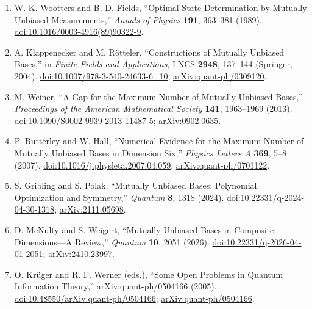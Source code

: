 \begin{enumerate}[label={},leftmargin=4.8em,labelsep=0.5em]
  \footnotesize
  \item[\textup{[WF89]}]\label{ref:p44-wootters-fields}
  W. K. Wootters and B. D. Fields,
  ``Optimal State-Determination by Mutually Unbiased Measurements,''
  \emph{Annals of Physics} \textbf{191}, 363--381 (1989).
  \href{https://doi.org/10.1016/0003-4916(89)90322-9}%
       {doi:10.1016/0003-4916(89)90322-9}.

  \item[\textup{[KR04]}]\label{ref:p44-klappenecker-roetteler}
  A. Klappenecker and M. R\"otteler,
  ``Constructions of Mutually Unbiased Bases,'' in
  \emph{Finite Fields and Applications}, LNCS \textbf{2948}, 137--144
  (Springer, 2004).
  \href{https://doi.org/10.1007/978-3-540-24633-6_10}%
       {doi:10.1007/978-3-540-24633-6\_10};
  \href{https://arxiv.org/abs/quant-ph/0309120}{arXiv:quant-ph/0309120}.

  \item[\textup{[Wei13]}]\label{ref:p44-weiner}
  M. Weiner, ``A Gap for the Maximum Number of Mutually Unbiased Bases,''
  \emph{Proceedings of the American Mathematical Society} \textbf{141},
  1963--1969 (2013).
  \href{https://doi.org/10.1090/S0002-9939-2013-11487-5}%
       {doi:10.1090/S0002-9939-2013-11487-5};
  \href{https://arxiv.org/abs/0902.0635}{arXiv:0902.0635}.

  \item[\textup{[BH07]}]\label{ref:p44-butterley-hall}
  P. Butterley and W. Hall,
  ``Numerical Evidence for the Maximum Number of Mutually Unbiased Bases in
  Dimension Six,'' \emph{Physics Letters A} \textbf{369}, 5--8 (2007).
  \href{https://doi.org/10.1016/j.physleta.2007.04.059}%
       {doi:10.1016/j.physleta.2007.04.059};
  \href{https://arxiv.org/abs/quant-ph/0701122}{arXiv:quant-ph/0701122}.

  \item[\textup{[GP24]}]\label{ref:p44-gribling-polak}
  S. Gribling and S. Polak,
  ``Mutually Unbiased Bases: Polynomial Optimization and Symmetry,''
  \emph{Quantum} \textbf{8}, 1318 (2024).
  \href{https://doi.org/10.22331/q-2024-04-30-1318}%
       {doi:10.22331/q-2024-04-30-1318};
  \href{https://arxiv.org/abs/2111.05698}{arXiv:2111.05698}.

  \item[\textup{[MW26]}]\label{ref:p44-mcnulty-weigert}
  D. McNulty and S. Weigert,
  ``Mutually Unbiased Bases in Composite Dimensions---A Review,''
  \emph{Quantum} \textbf{10}, 2051 (2026).
  \href{https://doi.org/10.22331/q-2026-04-01-2051}%
       {doi:10.22331/q-2026-04-01-2051};
  \href{https://arxiv.org/abs/2410.23997}{arXiv:2410.23997}.

  \item[\textup{[KW05]}]\label{ref:p44-krueger-werner}
  O. Kr\"uger and R. F. Werner (eds.),
  ``Some Open Problems in Quantum Information Theory,''
  arXiv:quant-ph/0504166 (2005).
  \href{https://doi.org/10.48550/arXiv.quant-ph/0504166}%
       {doi:10.48550/arXiv.quant-ph/0504166};
  \href{https://arxiv.org/abs/quant-ph/0504166}%
       {arXiv:quant-ph/0504166}.
\end{enumerate}

